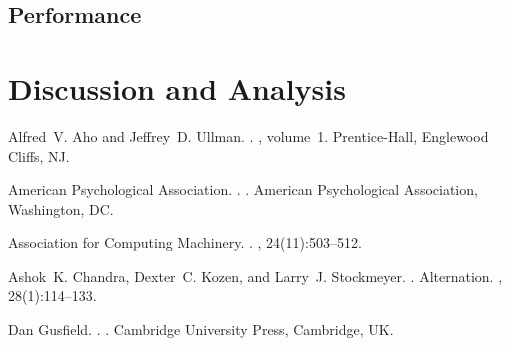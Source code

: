\documentclass[11pt,letterpaper]{article}
\begin{document}
\subsection{Performance}

\section{Discussion and Analysis}

\begin{thebibliography}{}

Alfred~V. Aho and Jeffrey~D. Ullman.
.
, volume~1.
\newblock Prentice-{Hall}, Englewood Cliffs, NJ.

{American Psychological Association}.
.
.
\newblock American Psychological Association, Washington, DC.

{Association for Computing Machinery}.
.
, 24(11):503--512.

Ashok~K. Chandra, Dexter~C. Kozen, and Larry~J. Stockmeyer.
.
\newblock Alternation.
,
  28(1):114--133.

Dan Gusfield.
.
.
\newblock Cambridge University Press, Cambridge, UK.

\end{thebibliography}
\end{document}
